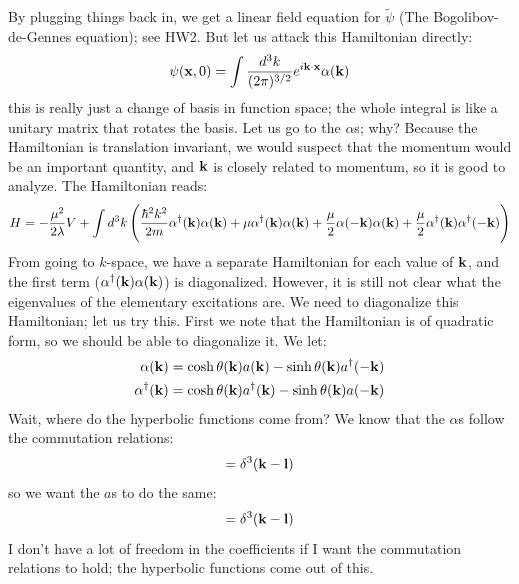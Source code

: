 By plugging things back in, we get a linear field equation for $\tilde{\psi}$ (The Bogolibov-de-Gennes equation); see HW2. But let us attack this Hamiltonian directly:
\begin{equation}
    \psi(\mathbf{x}, 0) = \int \frac{d^3k}{(2\pi)^{3/2}}e^{i\mathbf{k} \cdot \mathbf{x}}\alpha(\mathbf{k})
\end{equation}
this is really just a change of basis in function space; the whole integral is like a unitary matrix that rotates the basis. Let us go to the $\alpha$s; why? Because the Hamiltonian is translation invariant, we would suspect that the momentum would be an important quantity, and $\mathbf{k}$ is closely related to momentum, so it is good to analyze. The Hamiltonian reads:
\begin{equation}
    H = -\frac{\mu^2}{2\lambda}V + \int d^3k \left(\frac{\hbar^2k^2}{2m}\alpha^\dagger(\mathbf{k})\alpha(\mathbf{k}) + \mu \alpha^\dagger(\mathbf{k})\alpha(\mathbf{k}) + \frac{\mu}{2}\alpha(-\mathbf{k})\alpha(\mathbf{k}) + \frac{\mu}{2}\alpha^\dagger(\mathbf{k})\alpha^{\dagger}(-\mathbf{k})\right)
\end{equation}
From going to $k$-space, we have a separate Hamiltonian for each value of $\mathbf{k}$, and the first term ($\alpha^\dagger(\mathbf{k})\alpha(\mathbf{k})$) is diagonalized. However, it is still not clear what the eigenvalues of the elementary excitations are. We need to diagonalize this Hamiltonian; let us try this. First we note that the Hamiltonian is of quadratic form, so we should be able to diagonalize it. We let:
\begin{equation}\label{eq-bogoliubov}
    \begin{split}
        \alpha(\mathbf{k}) &= \cosh\theta(\mathbf{k})a(\mathbf{k}) - \sinh\theta(\mathbf{k})a^{\dagger}(-\mathbf{k})
        \\ \alpha^\dagger(\mathbf{k}) &= \cosh\theta(\mathbf{k})a^\dagger(\mathbf{k}) - \sinh\theta(\mathbf{k})a(-\mathbf{k})
    \end{split}
\end{equation}
Wait, where do the hyperbolic functions come from? We know that the $\alpha$s follow the commutation relations:
\begin{equation}
    [\alpha(\v{k}), \alpha^\dag(\v{l})] = \delta^3(\v{k} - \v{l})
\end{equation}
so we want the $a$s to do the same:
\begin{equation}
    [a(\v{k}), a^\dag(\v{l})] = \delta^3(\v{k} - \v{l})
\end{equation}
I don't have a lot of freedom in the coefficients if I want the commutation relations to hold; the hyperbolic functions come out of this.


